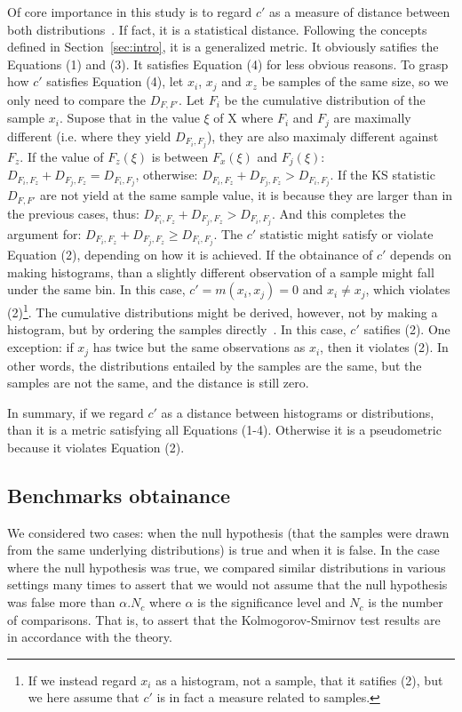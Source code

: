 \documentclass[12pt,fleqn]{article}
\begin{document}
Of core importance in this study is to regard $c'$
as a measure of distance between both distributions~\cite{kolm}.
If fact, it is a statistical distance.
Following the concepts defined in Section~\ref{sec:intro},
it is a generalized metric.
It obviously satifies the Equations (1) and (3).
It satisfies Equation (4) for less obvious reasons.
To grasp how $c'$ satisfies Equation (4),
let $x_i$, $x_j$ and $x_z$ be samples of the same size,
so we only need to compare the $D_{F,F'}$.
Let $F_i$ be the cumulative distribution of the sample $x_i$.
Supose that in the value $\xi$ of X where $F_i$ and $F_j$ are maximally different (i.e. where they yield $D_{F_i,F_j}$),
they are also maximaly different against $F_z$.
If the value of $F_z(\xi)$ is between $F_x(\xi)$ and $F_j(\xi)$:
$D_{F_i,F_z}+D_{F_j,F_z} = D_{F_i,F_j}$,
otherwise:
$D_{F_i,F_z}+D_{F_j,F_z} > D_{F_i,F_j}$.
If the KS statistic $D_{F,F'}$ are not yield at the same sample value,
it is because they are larger than in the previous cases, thus:
$D_{F_i,F_z}+D_{F_j,F_z} > D_{F_i,F_j}$.
And this completes the argument for:
$D_{F_i,F_z}+D_{F_j,F_z} \geq D_{F_i,F_j}$.
The $c'$ statistic might satisfy or violate Equation (2),
depending on how it is achieved.
If the obtainance of $c'$ depends on making histograms,
than a slightly different observation of a sample might fall under the same bin.
In this case, $c'=m(x_i,x_j) = 0$ and $x_i \neq x_j$, which violates (2)\footnote{If
we instead regard $x_i$ as a histogram, not a sample,
that it satifies (2), but we here assume that $c'$
is in fact a measure related to samples.}.
The cumulative distributions might be derived, however,
not by making a histogram, but by ordering the samples directly~\citep{stack}.
In this case, $c'$ satifies (2).
One exception: if $x_j$ has twice but the same observations as $x_i$,
then it violates (2).
In other words, the distributions entailed by the samples are the same,
but the samples are not the same, and the distance is still zero.

In summary, if we regard $c'$ as a distance between histograms or distributions,
than it is a metric satisfying all Equations (1-4).
Otherwise it is a pseudometric because it violates Equation (2).

\subsection{Benchmarks obtainance}
We considered two cases: when the null hypothesis (that the samples were drawn from the same underlying distributions)
is true and when it is false.
In the case where the null hypothesis was true, 
we compared similar distributions in various settings
many times to assert that we would not assume
that the null hypothesis was false more than
$\alpha . N_c$ where $\alpha$ is the significance level
and $N_c$ is the number of comparisons.
That is, to assert that the Kolmogorov-Smirnov test results
are in accordance with the theory.
\end{document}
